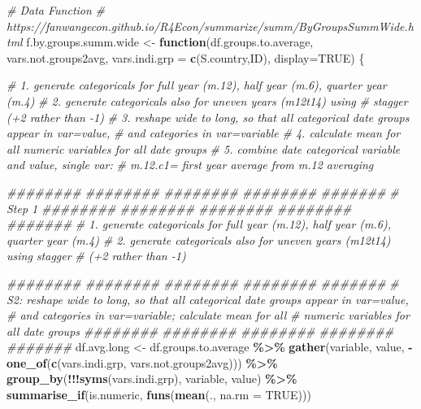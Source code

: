 \documentclass[
]{book}
\newenvironment{Shaded}{\begin{snugshade}}{\end{snugshade}}
\newcommand{\CommentTok}[1]{\textcolor[rgb]{0.56,0.35,0.01}{\textit{#1}}}
\newcommand{\ControlFlowTok}[1]{\textcolor[rgb]{0.13,0.29,0.53}{\textbf{#1}}}
\newcommand{\DataTypeTok}[1]{\textcolor[rgb]{0.13,0.29,0.53}{#1}}
\newcommand{\KeywordTok}[1]{\textcolor[rgb]{0.13,0.29,0.53}{\textbf{#1}}}
\newcommand{\NormalTok}[1]{#1}
\newcommand{\OperatorTok}[1]{\textcolor[rgb]{0.81,0.36,0.00}{\textbf{#1}}}
\newcommand{\OtherTok}[1]{\textcolor[rgb]{0.56,0.35,0.01}{#1}}
\newcommand{\StringTok}[1]{\textcolor[rgb]{0.31,0.60,0.02}{#1}}
\begin{document}
\begin{Shaded}
\begin{Highlighting}[]
\CommentTok{\# Data Function}
\CommentTok{\# https://fanwangecon.github.io/R4Econ/summarize/summ/ByGroupsSummWide.html}
\NormalTok{f.by.groups.summ.wide \textless{}{-}}\StringTok{ }\ControlFlowTok{function}\NormalTok{(df.groups.to.average,}
\NormalTok{                                  vars.not.groups2avg,}
                                  \DataTypeTok{vars.indi.grp =} \KeywordTok{c}\NormalTok{(}\StringTok{\textquotesingle{}S.country\textquotesingle{}}\NormalTok{,}\StringTok{\textquotesingle{}ID\textquotesingle{}}\NormalTok{),}
                                  \DataTypeTok{display=}\OtherTok{TRUE}\NormalTok{) \{}

\CommentTok{\# 1. generate categoricals for full year (m.12), half year (m.6), quarter year (m.4)}
\CommentTok{\# 2. generate categoricals also for uneven years (m12t14) using }
\CommentTok{\#  stagger (+2 rather than {-}1)}
\CommentTok{\# 3. reshape wide to long, so that all categorical date groups appear in var=value,}
    \CommentTok{\# and categories in var=variable}
\CommentTok{\# 4. calculate mean for all numeric variables for all date groups}
\CommentTok{\# 5. combine date categorical variable and value, single var:}
    \CommentTok{\# m.12.c1= first year average from m.12 averaging}

\CommentTok{\#\#\#\#\#\#\#\# \#\#\#\#\#\#\#\# \#\#\#\#\#\#\#\# \#\#\#\#\#\#\#\# \#\#\#\#\#\#\#}
\CommentTok{\# Step 1}
\CommentTok{\#\#\#\#\#\#\#\# \#\#\#\#\#\#\#\# \#\#\#\#\#\#\#\# \#\#\#\#\#\#\#\# \#\#\#\#\#\#\#}
\CommentTok{\# 1. generate categoricals for full year (m.12), half year (m.6), quarter year (m.4)}
\CommentTok{\# 2. generate categoricals also for uneven years (m12t14) using stagger }
\CommentTok{\#  (+2 rather than {-}1)}

\CommentTok{\#\#\#\#\#\#\#\# \#\#\#\#\#\#\#\# \#\#\#\#\#\#\#\# \#\#\#\#\#\#\#\# \#\#\#\#\#\#\#}
\CommentTok{\# S2: reshape wide to long, so that all categorical date groups appear in var=value,}
\CommentTok{\# and categories in var=variable; calculate mean for all }
\CommentTok{\# numeric variables for all date groups}
\CommentTok{\#\#\#\#\#\#\#\# \#\#\#\#\#\#\#\# \#\#\#\#\#\#\#\# \#\#\#\#\#\#\#\# \#\#\#\#\#\#\#}
\NormalTok{df.avg.long \textless{}{-}}\StringTok{ }\NormalTok{df.groups.to.average }\OperatorTok{\%\textgreater{}\%}
\StringTok{       }\KeywordTok{gather}\NormalTok{(variable, value, }\OperatorTok{{-}}\KeywordTok{one\_of}\NormalTok{(}\KeywordTok{c}\NormalTok{(vars.indi.grp,}
\NormalTok{                                         vars.not.groups2avg))) }\OperatorTok{\%\textgreater{}\%}
\StringTok{       }\KeywordTok{group\_by}\NormalTok{(}\OperatorTok{!!!}\KeywordTok{syms}\NormalTok{(vars.indi.grp), variable, value) }\OperatorTok{\%\textgreater{}\%}
\StringTok{       }\KeywordTok{summarise\_if}\NormalTok{(is.numeric, }\KeywordTok{funs}\NormalTok{(}\KeywordTok{mean}\NormalTok{(., }\DataTypeTok{na.rm =} \OtherTok{TRUE}\NormalTok{)))}


\end{Highlighting}
\end{Shaded}
\end{document}
